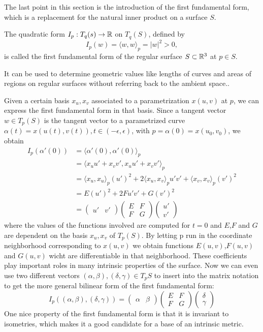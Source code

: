 The last point in this section is the introduction of the first fundamental form, which is a replacement for the natural inner product on a surface $S$.
\begin{mydef}
	The quadratic form $I_p : T_q(s) \rightarrow \mathbb{R}$ on $T_q(S)$, defined by
	$$I_p(w) =  \langle w,w\rangle_p = |w|^2 > 0,$$
	is called the first fundamental form of the regular surface $S\subset\mathbb{R}^3$ at $p\in S$.
\end{mydef}
It can be used to determine geometric values like lengths of curves and areas of regions on regular surfaces without referring back to the ambient space..

Given a certain basis ${x_u, x_v}$ associated to a parametrization $x(u,v)$ at $p$, we can express the first fundamental form in that basis.
Since a tangent vector $w\in T_p(S)$ is the tangent vector to a parametrized curve $\alpha(t) = x(u(t),v(t)), t\in (-\epsilon,\epsilon)$, with $p = \alpha(0) = x(u_0,v_0)$, we obtain
\begin{align*}
	I_p(\alpha'(0)) &= \langle \alpha'(0),\alpha'(0)\rangle_p \\
					&= \langle x_u u' + x_v v',x_u u' + x_v v' \rangle_p \\
					&= \langle x_u ,x_u \rangle_p  (u')^2 + 2\langle x_u ,x_v \rangle_p u' v' + \langle x_v ,x_v \rangle_p (v')^2 \\
					&= E(u')^2 + 2Fu'v'+G(v')^2 \\
					&= \begin{pmatrix} u' & v' \end{pmatrix} \begin{pmatrix} E & F \\ F & G \end{pmatrix} \begin{pmatrix}u' \\ v'\end{pmatrix}
\end{align*}
where the values of the functions involved are computed for $t = 0$ and $E$,$F$ and $G$ are dependent on the basis ${x_u,x_v}$ of $T_p(S)$.
By letting p run in the coordinate neighborhood corresponding to $x(u,v)$ we obtain functions $E(u,v)$,$F(u,v)$ and $G(u,v)$ wicht are differentiable in that neighborhood.
These coefficients play important roles in many intrinsic properties of the surface.
Now we can even use two different vectors $(\alpha,\beta), (\delta,\gamma) \in T_pS$ to insert into the matrix notation to get the more general bilinear form of the first fundamental form:
$$I_p((\alpha, \beta),(\delta, \gamma)) = \begin{pmatrix} \alpha & \beta \end{pmatrix} \begin{pmatrix} E & F \\ F & G \end{pmatrix} \begin{pmatrix}\delta \\ \gamma\end{pmatrix}$$
One nice property of the first fundamental form is that it is invariant to isometries, which makes it a good candidate for a base of an intrinsic metric.

